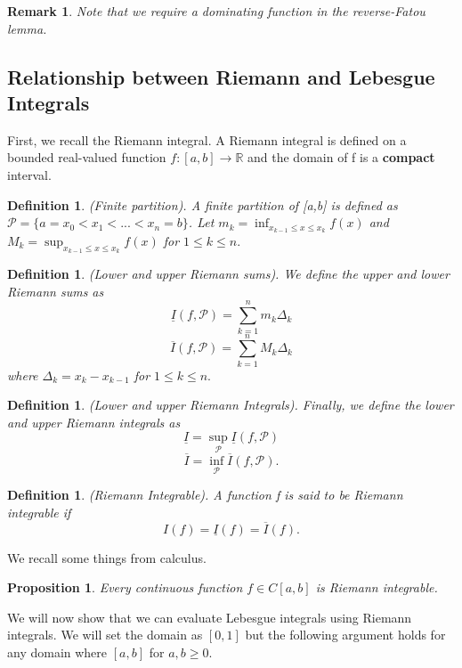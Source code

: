 \documentclass[twoside]{article}
\newtheorem{proposition}[theorem]{Proposition}
\newtheorem{definition}[theorem]{Definition}
\newtheorem{remark}[theorem]{Remark}
\begin{document}
\begin{remark}Note that we require a dominating function in the reverse-Fatou lemma.
\end{remark}



\subsection{Relationship between Riemann and Lebesgue Integrals}

First, we recall the Riemann integral. A Riemann integral is defined on a bounded real-valued function $f: [a,b] \rightarrow \mathbb{R}$ and the domain of f is a \textbf{compact} interval.

\begin{definition}(Finite partition). A finite partition of [a,b] is defined as $\mathcal{P} = \{a = x_0 < x_1 < ... < x_n = b\}$. 
Let $m_k = \inf_{x_{k-1} \leq x \leq x_{k}}f(x)$ and $M_k = \sup_{x_{k-1} \leq x \leq x_{k}}f(x)$ for $1 \leq k \leq n.$
\end{definition}

\begin{definition}(Lower and upper Riemann sums). We define the upper and lower Riemann sums as 
$$
\underline{I}(f, \mathcal{P}) = \sum_{k=1}^{n}m_k\Delta_k
$$
$$
\overline{I}(f, \mathcal{P}) = \sum_{k=1}^{n}M_k\Delta_k
$$
where $\Delta_k = x_k - x_{k-1}$ for $1 \leq k \leq n.$
\end{definition}

\begin{definition}(Lower and upper Riemann Integrals). Finally, we define the lower and upper Riemann integrals as 
$$
\underline{I} = \sup_{\mathcal{P}}\underline{I}(f, \mathcal{P})
$$
$$
\overline{I} = \inf_{\mathcal{P}}\overline{I}(f, \mathcal{P}).
$$
\end{definition}

\begin{definition}(Riemann Integrable). A function f is said to be Riemann integrable if 
$$
I(f) = \underline{I}(f) = \overline{I}(f).
$$
\end{definition}

We recall some things from calculus.
\begin{proposition}Every continuous function $f \in C[a,b]$ is Riemann integrable.
\end{proposition}


We will now show that we can evaluate Lebesgue integrals using Riemann integrals. We will set the domain as $[0,1]$ but the following argument holds for any domain where $[a,b]$ for $a, b \geq 0.$
\end{document}
